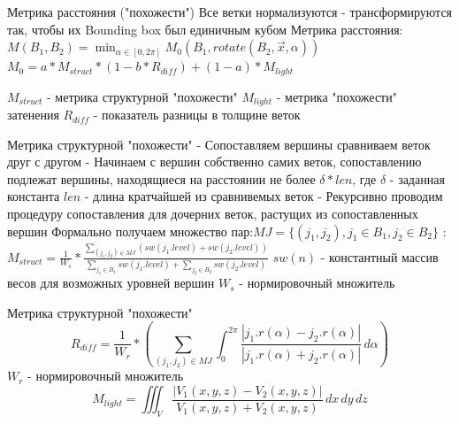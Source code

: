 \documentclass[11pt]{beamer}
\begin{document}
\begin{frame}{Метрика расстояния ("похожести")}
Все ветки нормализуются - трансформируются так, чтобы их 
Bounding box был единичным кубом\linebreak 
Метрика расстояния:\linebreak \linebreak 
$M(B_1,B_2) = \min_{\alpha \in [0,2\pi]} M_0(B_1,rotate(B_2,\vec{x},\alpha))$
$M_0 = a*M_{struct}*(1 - b*R_{diff}) + (1 - a)*M_{light}$

$M_{struct}$ - метрика структурной "похожести"\linebreak 
$M_{light}$ - метрика "похожести" затенения\linebreak 
$R_{diff}$ - показатель разницы в толщине веток\linebreak 


\end{frame}
\begin{frame}{Метрика структурной "похожести"}
- Сопоставляем вершины сравниваем веток друг с другом\linebreak 
- Начинаем с вершин собственно самих веток, сопоставлению подлежат вершины, находящиеся на расстоянии не более $\delta*len$, где 
$\delta$ - заданная константа\linebreak 
$len$ - длина кратчайшей из сравнивемых веток\linebreak 
- Рекурсивно проводим процедуру сопоставления для дочерних веток, растущих из сопоставленных вершин\linebreak 
Формально получаем множество пар:\linebreak $MJ = \{(j_1,j_2), j_1 \in B_1, j_2 \in B_2\}$
:\linebreak\linebreak
$M_{struct} = \frac{1}{W_s}*\frac{\sum_{(j_1,j_2) \in MJ} (sw(j_1.level) + sw(j_2.level))}{\sum_{j_1 \in B_1} sw(j_1.level) + \sum_{j_2 \in B_2} sw(j_2.level)}$\linebreak
$sw(n)$ - константный массив весов для возможных уровней вершин\linebreak
$W_s$ - нормировочный множитель
\end{frame}
\begin{frame}{Метрика структурной "похожести"}
\[R_{diff} = \frac{1}{W_r}*(\sum_{(j_1,j_2) \in MJ} \int_{0}^{2\pi} \frac{|j_1.r(\alpha) - j_2.r(\alpha)|}{|j_1.r(\alpha) + j_2.r(\alpha)|} \,d\alpha)\]\linebreak
$W_r$ - нормировочный множитель
\[M_{light} = \iiint_V \frac{|V_1(x,y,z) - V_2(x,y,z)|}{V_1(x,y,z) + V_2(x,y,z)} \,dx\,dy\,dz\]
\end{frame}
\end{document}
